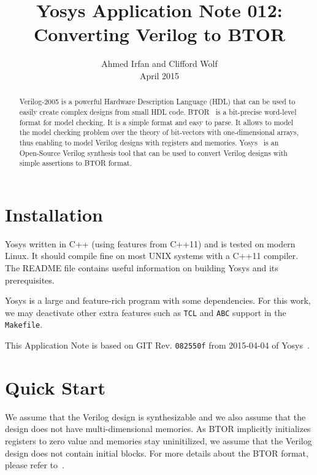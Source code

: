 \documentclass[9pt,technote,a4paper]{IEEEtran}
\begin{document}
\title{Yosys Application Note 012: \\ Converting Verilog to BTOR}
\author{Ahmed Irfan and Clifford Wolf \\ April 2015}
\maketitle

\begin{abstract}
Verilog-2005 is a powerful Hardware Description Language (HDL) that
can be used to easily create complex designs from small HDL code.
BTOR~\cite{btor} is a bit-precise word-level format for model
checking.  It is a simple format and easy to parse. It allows to model
the model checking problem over the theory of bit-vectors with
one-dimensional arrays, thus enabling to model Verilog designs with
registers and memories.  Yosys~\cite{yosys} is an Open-Source Verilog
synthesis tool that can be used to convert Verilog designs with simple
assertions to BTOR format.

\end{abstract}

\section{Installation}

Yosys written in C++ (using features from C++11) and is tested on
modern Linux.  It should compile fine on most UNIX systems with a
C++11 compiler. The README file contains useful information on
building Yosys and its prerequisites.

Yosys is a large and feature-rich program with some dependencies. For
this work, we may deactivate other extra features such as {\tt TCL}
and {\tt ABC} support in the {\tt Makefile}.

\bigskip

This Application Note is based on GIT Rev. {\tt 082550f} from
2015-04-04 of Yosys~\cite{yosys}.

\section{Quick Start}

We assume that the Verilog design is synthesizable and we also assume
that the design does not have multi-dimensional memories.  As BTOR
implicitly initializes registers to zero value and memories stay
uninitilized, we assume that the Verilog design does
not contain initial blocks. For more details about the BTOR format,
please refer to~\cite{btor}.
\end{document}
